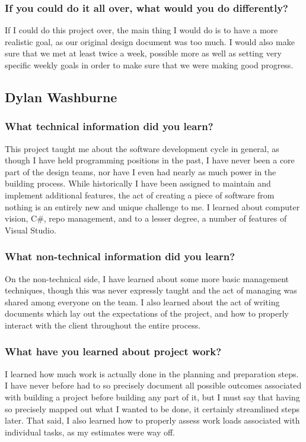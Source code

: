 \documentclass[onecolumn, draftclsnofoot,10pt, compsoc]{IEEEtran}
\begin{document}
\subsubsection{If you could do it all over, what would you do differently?}

If I could do this project over, the main thing I would do is to have a more realistic goal, as our original design document was too much.
I would also make sure that we met at least twice a week, possible more as well as setting very specific weekly goals in order to make sure that we were making good progress.


\subsection{Dylan Washburne}
\subsubsection{What technical information did you learn?}
This project taught me about the software development cycle in general, as though I have held programming positions in the past, I have never been a core part of the design teams, nor have I even had nearly as much power in the building process.  While historically I have been assigned to maintain and implement additional features, the act of creating a piece of software from nothing is an entirely new and unique challenge to me.  I learned about computer vision, C\#, repo management, and to a lesser degree, a number of features of Visual Studio.

\subsubsection{What non-technical information did you learn?}
On the non-technical side, I have learned about some more basic management techniques, though this was never expressly taught and the act of managing was shared among everyone on the team.  I also learned about the act of writing documents which lay out the expectations of the project, and how to properly interact with the client throughout the entire process.

\subsubsection{What have you learned about project work?}
I learned how much work is actually done in the planning and preparation steps.  I have never before had to so precisely document all possible outcomes associated with building a project before building any part of it, but I must say that having so precisely mapped out what I wanted to be done, it certainly streamlined steps later.  That said, I also learned how to properly assess work loads associated with individual tasks, as my estimates were way off.
\end{document}
